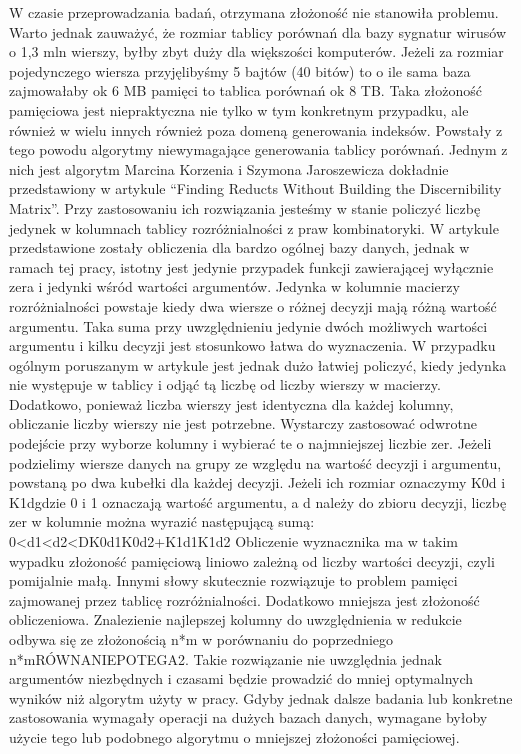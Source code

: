W czasie przeprowadzania badań, otrzymana złożoność nie stanowiła problemu.
Warto jednak zauważyć, że rozmiar tablicy porównań dla bazy sygnatur wirusów o 1,3 mln wierszy, byłby zbyt duży dla większości komputerów.
Jeżeli za rozmiar pojedynczego wiersza przyjęlibyśmy 5 bajtów (40 bitów) to o ile sama baza zajmowałaby ok 6 MB pamięci to tablica porównań ok 8 TB.
Taka złożoność pamięciowa jest niepraktyczna nie tylko w tym konkretnym przypadku, ale również w wielu innych również poza domeną generowania indeksów.
Powstały z tego powodu algorytmy niewymagające generowania tablicy porównań.
Jednym z nich jest algorytm Marcina Korzenia i Szymona Jaroszewicza dokładnie przedstawiony w artykule “Finding Reducts Without Building the Discernibility Matrix”.
Przy zastosowaniu ich rozwiązania jesteśmy w stanie policzyć liczbę jedynek w kolumnach tablicy rozróżnialności z praw kombinatoryki.
W artykule przedstawione zostały obliczenia dla bardzo ogólnej bazy danych, jednak w ramach tej pracy, istotny jest jedynie przypadek funkcji zawierającej wyłącznie zera i jedynki wśród wartości argumentów.
Jedynka w kolumnie macierzy rozróżnialności powstaje kiedy dwa wiersze o różnej decyzji mają różną wartość argumentu.
Taka suma przy uwzględnieniu jedynie dwóch możliwych wartości argumentu i kilku decyzji jest stosunkowo łatwa do wyznaczenia.
W przypadku ogólnym poruszanym w artykule jest jednak dużo łatwiej policzyć, kiedy jedynka nie występuje w tablicy i odjąć tą liczbę od liczby wierszy w macierzy.
Dodatkowo, ponieważ liczba wierszy jest identyczna dla każdej kolumny, obliczanie liczby wierszy nie jest potrzebne.
Wystarczy zastosować odwrotne podejście przy wyborze kolumny i wybierać te o najmniejszej liczbie zer.
Jeżeli podzielimy wiersze danych na grupy ze względu na wartość decyzji i argumentu, powstaną po dwa kubełki dla każdej decyzji.
Jeżeli ich rozmiar oznaczymy K0d i K1dgdzie 0 i 1 oznaczają wartość argumentu, a d należy do zbioru decyzji, liczbę zer w kolumnie można wyrazić następującą sumą:
0<d1<d2<DK0d1K0d2+K1d1K1d2
Obliczenie wyznacznika ma w takim wypadku złożoność pamięciową liniowo zależną od liczby wartości decyzji, czyli pomijalnie małą.
Innymi słowy skutecznie rozwiązuje to problem pamięci zajmowanej przez tablicę rozróżnialności.
Dodatkowo mniejsza jest złożoność obliczeniowa.
Znalezienie najlepszej kolumny do uwzględnienia w redukcie odbywa się ze złożonością n*m w porównaniu do poprzedniego n*mRÓWNANIEPOTEGA2.
Takie rozwiązanie nie uwzględnia jednak argumentów niezbędnych i czasami będzie prowadzić do mniej optymalnych wyników niż algorytm użyty w pracy.
Gdyby jednak dalsze badania lub konkretne zastosowania wymagały operacji na dużych bazach danych, wymagane byłoby użycie tego lub podobnego algorytmu o mniejszej złożoności pamięciowej.

